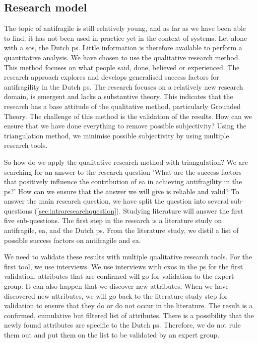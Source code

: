 \subsection{Research model}
\label{sec:researchmodel}
The topic of \gls{antifragile} is still relatively young, and as far as we have been able to find, it has not been used in practice yet in the context of systems. Let alone with a \gls{sos}, the Dutch \gls{ps}. Little information is therefore available to perform a quantitative analysis. We have chosen to use the qualitative research method. This method focuses on what people said, done, believed or experienced. The research approach explores and develops generalised success factors for \gls{antifragility} in the Dutch \gls{ps}. The research focuses on a relatively new research domain, is emergent and lacks a substantive theory. This indicates that the research has a base attitude of the qualitative method, particularly Grounded Theory. The challenge of this method is the validation of the results. How can we ensure that we have done everything to remove possible subjectivity? Using the triangulation method, we minimise possible subjectivity by using multiple research tools.

So how do we apply the qualitative research method with triangulation? We are searching for an answer to the research question 'What are the success factors that positively influence the contribution of \gls{ea} in achieving \gls{antifragility} in the \gls{ps}?' How can we ensure that the answer we will give is reliable and valid? To answer the main research question, we have split the question into several sub-questions (\cref{sec:introresearchquestion}). Studying literature will answer the first five sub-questions. The first step in the research is a literature study on \gls{antifragile}, \gls{ea}, and the Dutch \gls{ps}. From the literature study, we distil a list of possible success factors on \gls{antifragile} and \gls{ea}.

We need to validate these results with multiple qualitative research tools. For the first tool, we use interviews. We use interviews with \glspl{cxo} in the \gls{ps} for the first validation. \Glspl{attribute} that are confirmed will go for validation to the expert group. It can also happen that we discover new \glspl{attribute}. When we have discovered new \glspl{attribute}, we will go back to the literature study step for validation to ensure that they do or do not occur in the literature. The result is a confirmed, cumulative but filtered list of \glspl{attribute}. There is a possibility that the newly found \glspl{attribute} are specific to the Dutch \gls{ps}. Therefore, we do not rule them out and put them on the list to be validated by an expert group.

